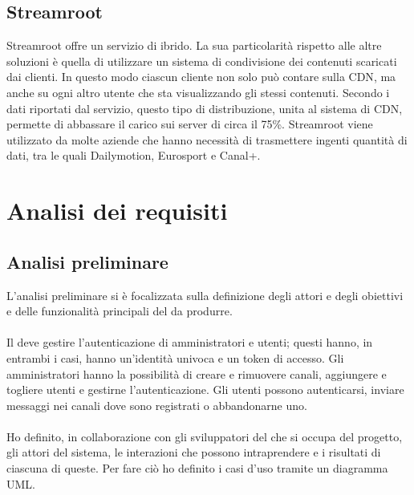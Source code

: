 		\subsection{Streamroot}
		Streamroot offre un servizio di  ibrido. La sua particolarità rispetto alle altre soluzioni è quella di utilizzare un sistema di condivisione  dei contenuti scaricati dai clienti. In questo modo ciascun cliente non solo può contare sulla \gls{CDN}, ma anche su ogni altro utente che sta visualizzando gli stessi contenuti. Secondo i dati riportati dal servizio, questo tipo di distribuzione, unita al sistema di \gls{CDN}, permette di abbassare il carico sui server di circa il 75\%. Streamroot viene utilizzato da molte aziende che hanno necessità di trasmettere ingenti quantità di dati, tra le quali Dailymotion, Eurosport e Canal+.
	

\section{Analisi dei requisiti}
	\subsection{Analisi preliminare}
		L'analisi preliminare si è focalizzata sulla definizione degli attori e degli obiettivi e delle funzionalità principali del  da produrre.
		\paragraph*{}
		Il  deve gestire l'autenticazione di amministratori e utenti; questi hanno, in entrambi i casi, hanno un'identità univoca e un token di accesso. Gli amministratori hanno la possibilità di creare e rimuovere canali, aggiungere e togliere utenti e gestirne l'autenticazione.
		Gli utenti possono autenticarsi, inviare messaggi nei canali dove sono registrati o abbandonarne uno.
		\paragraph*{}
		Ho definito, in collaborazione con gli sviluppatori del  che si occupa del progetto, gli attori del sistema, le interazioni che possono intraprendere e i risultati di ciascuna di queste. Per fare ciò ho definito i casi d'uso tramite un diagramma \gls{UML}.\@

